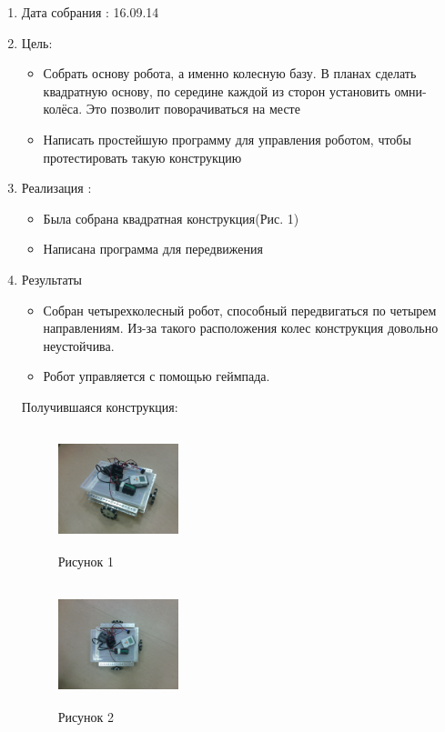 
	\begin{enumerate}
		\item Дата собрания : 16.09.14
		\item Цель:
		\begin{itemize}
			\item Собрать основу робота, а именно колесную базу. В планах сделать квадратную основу, по середине каждой из сторон установить омни-колёса. Это позволит поворачиваться на месте
			\item Написать простейшую программу для управления роботом, чтобы протестировать такую конструкцию
		\end{itemize}			
		\item Реализация :
		\begin{itemize}
			\item Была собрана квадратная конструкция(Рис. 1)
			\item Написана программа для передвижения
		\end{itemize}
		\item Результаты
		\begin{itemize}
			\item Собран четырехколесный робот, способный передвигаться по четырем направлениям. Из-за такого расположения колес конструкция довольно неустойчива.
			\item Робот управляется с помощью геймпада.
		\end{itemize}
		Получившаяся конструкция:
		\begin{figure} [h]
			\centering
			\begin{minipage}{0.3\linewidth}
				\includegraphics[width=35mm,height=35mm]{Days/16.09.14/1_1_robot.png}\\ Рисунок 1
			\end{minipage}
			\begin{minipage}{0.3\linewidth}
				\includegraphics[width=35mm,height=35mm]{Days/16.09.14/1_2_robot}\\ Рисунок 2
			\end{minipage}
		\end{figure}
	\end{enumerate}
\fillpage